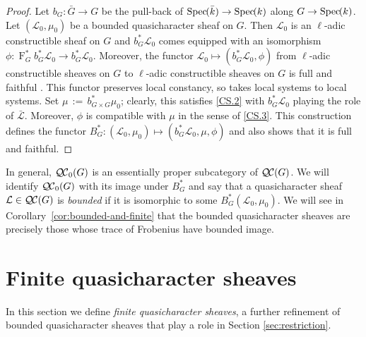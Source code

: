 \documentclass[11pt]{amsart}
\theoremstyle{plain}
\theoremstyle{definition}
\theoremstyle{remark}
\newcommand{\Spec}[1]{{\operatorname{Spec}\hskip-1pt( #1 )}}
\newcommand{\bFq}{\bar{k}}
\newcommand{\Fq}{k}
\newcommand{\Frob}[1]{\operatorname{F}_{#1}}
\newcommand{\ceq}{{\, :=\, }}
\newcommand{\qcs}[1]{{\mathcal{#1}}}
\newcommand{\gqcs}[1]{{\mathcal{\bar #1}}}
\newcommand{\QC}{{\mathcal{Q\hskip-0.8pt C}}}
\newcommand{\QCb}{{\QC_0}}
\begin{document}
\begin{proof}
 Let $b_G : {\bar G} \to G$ be the pull-back of $\Spec{\bFq} \to \Spec{\Fq}$ along $G\to \Spec{\Fq}$.
 Let $(\qcs{L}_0,\mu_0)$ be a bounded quasicharacter sheaf on $G$. 
 Then $\qcs{L}_0$ is an $\ell$-adic constructible sheaf on $G$ and
 $b_G^* \qcs{L}_0$ comes equipped with an isomorphism 
 $\phi : \Frob{G}^* b_G^*\qcs{L}_0 \to b_G^* \qcs{L}_0$.
 Moreover, the functor $\qcs{L}_0 \mapsto (b_G^* \qcs{L}_0,\phi)$  
 from $\ell$-adic constructible sheaves on $G$ to $\ell$-adic constructible sheaves on $G$
 is full and faithful . 
 This functor preserves local constancy, so takes local systems to local systems. 
 Set $\mu \ceq b_{G\times G}^*\mu_0$; clearly, this satisfies \ref{CS.2} 
 with $b_G^*\qcs{L}_0$ playing the role of $\gqcs{L}$.
 Moreover, $\phi$ is compatible with $\mu$ in the sense of \ref{CS.3}.
 This construction defines the functor $B_G^* : (\qcs{L}_0,\mu_0) \mapsto (b_G^*\qcs{L}_0,\mu, \phi)$
 and also shows that it is full and faithful.
\end{proof}

In general, $\QCb(G)$ is an essentially
proper subcategory of $\QC(G)$. We will identify $\QCb(G)$ with its image under $B_G^*$
and say that a quasicharacter sheaf $\qcs{L} \in \QC(G)$ is \emph{bounded}
if it is isomorphic to some $B_G^*(\qcs{L}_0, \mu_0)$.
We will see in Corollary~\ref{cor:bounded-and-finite} that the bounded quasicharacter sheaves
are precisely those whose trace of Frobenius have bounded image.

\section{Finite quasicharacter sheaves}\label{sec:finite}

 
In this section we define \emph{finite quasicharacter sheaves}, a further refinement
of bounded quasicharacter sheaves that play a role in Section \ref{sec:restriction}.
\end{document}
